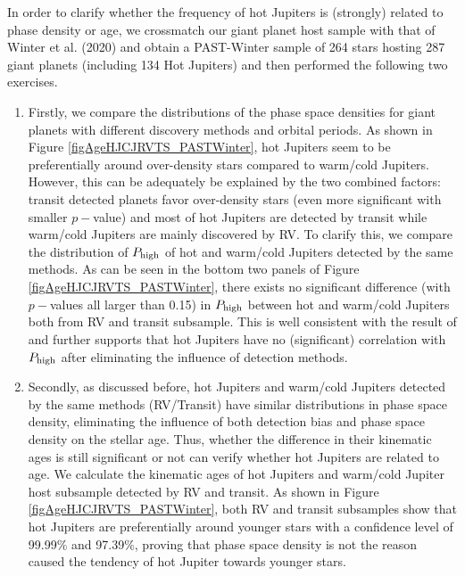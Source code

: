 \documentclass[twocolumn]{pnas-new}
\begin{document}
In order to clarify whether the frequency of hot Jupiters is (strongly) related to phase density or age, we crossmatch our giant planet host sample with that of Winter et al. (2020) \cite{2020Natur.586..528W} and obtain a PAST-Winter sample of 264 stars hosting 287 giant planets (including 134 Hot Jupiters) and then performed the following two exercises. 



\begin{enumerate}

\item  
Firstly, we compare the distributions of the phase space densities for giant planets with different discovery methods and orbital periods.
As shown in Figure \ref{figAgeHJCJRVTS_PASTWinter}, hot Jupiters seem to be preferentially around over-density stars compared to warm/cold Jupiters.
However, this can be adequately be explained by the two combined factors:
transit detected planets favor over-density stars (even more significant with smaller $p-$value) and most of hot Jupiters are detected by transit while warm/cold Jupiters are mainly discovered by RV.
To clarify this, we compare the distribution of $P_{\rm high}$ of hot and warm/cold Jupiters detected by the same methods. 
As can be seen in the bottom two panels of Figure \ref{figAgeHJCJRVTS_PASTWinter}, there exists no significant difference (with $p-$values all larger than 0.15) in $P_{\rm high}$ between hot and warm/cold Jupiters both from RV and transit subsample.
This is well consistent with the result of \cite{2021A&A...649A.111A} and further supports that hot Jupiters have no (significant) correlation with $P_{\rm high}$ after eliminating the influence of detection methods.

\item Secondly, as discussed before, hot Jupiters and warm/cold Jupiters detected by the same methods (RV/Transit) have similar distributions in phase space density, eliminating the influence of both detection bias and phase space density on the stellar age.
Thus, whether the difference in their kinematic ages is still significant or not can verify whether hot Jupiters are related to age.
We calculate the kinematic ages of hot Jupiters and warm/cold Jupiter host subsample detected by RV and transit.
As shown in Figure \ref{figAgeHJCJRVTS_PASTWinter}, both RV and transit subsamples show that hot Jupiters are preferentially around younger stars with a confidence level of 99.99\% and 97.39\%, proving that phase space density is not the reason caused the tendency of hot Jupiter towards younger stars.

\end{enumerate}
\end{document}

